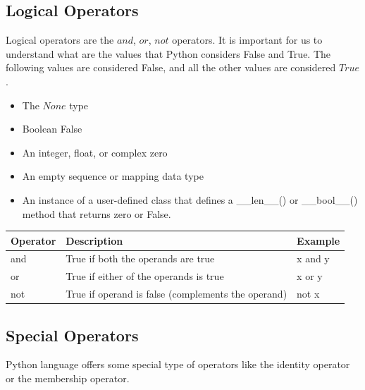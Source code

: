 \documentclass[../main.tex]{subfiles}
\begin{document}
\subsection{Logical Operators} 
Logical operators are the $and$, $or$, $not$ operators. It is important for us to understand what are the values that Python considers False and True. The following values are considered False, and all the other values are considered $True$. 
\begin{itemize}
    \item The $None$ type
    \item Boolean False
    \item An integer, float, or complex zero
    \item An empty sequence or mapping data type
    \item An instance of a user-defined class that defines a \_\_len\_\_() or \_\_bool\_\_() method that returns zero or False.
\end{itemize}
\begin{table}[h]
\begin{small}
\centering
\noindent{}
 \noindent \begin{tabular}{|p{}|p{}| p{}| }
  \hline
Operator& Description & Example  \\ \hline
and &	True if both the operands are true &	x and y\\ \hline
or &	True if either of the operands is true &	x or y\\ \hline
not &	True if operand is false (complements the operand) &	not x \\ \hline
\end{tabular}
  \label{tab:logical_operators}
  \end{small}
\end{table} 
\subsection{Special Operators}
Python language offers some special type of operators like the identity operator or the membership operator. 
\end{document}
